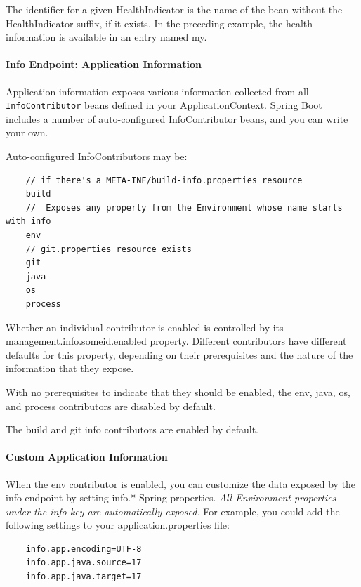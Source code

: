 \documentclass{scrartcl}
\begin{document}
The identifier for a given HealthIndicator is the name of the bean without the HealthIndicator suffix, if it exists. In the preceding example, the health information is available in an entry named my.

\paragraph{Info Endpoint: Application Information}

Application information exposes various information collected from all \lstinline|InfoContributor| beans defined in your ApplicationContext. Spring Boot includes a number of auto-configured InfoContributor beans, and you can write your own.

Auto-configured InfoContributors may be:

\begin{lstlisting}
    // if there's a META-INF/build-info.properties resource
    build
    //  Exposes any property from the Environment whose name starts with info
    env
    // git.properties resource exists
    git
    java
    os
    process
\end{lstlisting}

Whether an individual contributor is enabled is controlled by its management.info.someid.enabled property.
Different contributors have different defaults for this property, depending on their prerequisites and the nature of the information that they expose.

With no prerequisites to indicate that they should be enabled, the env, java, os, and process contributors are disabled by default.

The build and git info contributors are enabled by default.

\paragraph{Custom Application Information}

When the env contributor is enabled, you can customize the data exposed by the info endpoint by setting info.* Spring properties. \textit{All Environment properties under the info key are automatically exposed.} For example, you could add the following settings to your application.properties file:

    \begin{lstlisting}
    info.app.encoding=UTF-8
    info.app.java.source=17
    info.app.java.target=17

    \end{lstlisting}
\end{document}
